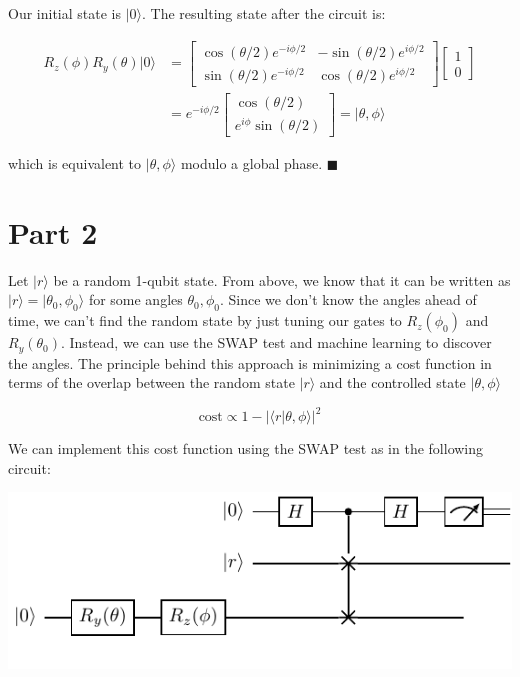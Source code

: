 \documentclass[11pt]{article}
\begin{document}
Our initial state is \(|0\rangle\). The resulting state after the circuit is:

\begin{align*}
R_z(\phi)R_y(\theta)|0\rangle &= 
\begin{bmatrix}
\cos(\theta/2)e^{-i\phi/2} & -\sin(\theta/2)e^{i\phi/2} \\
\sin(\theta/2)e^{-i\phi/2} & \cos(\theta/2)e^{i\phi/2}
\end{bmatrix}
\begin{bmatrix}
1 \\
0
\end{bmatrix} \\
&=
e^{-i\phi/2}\begin{bmatrix}
\cos(\theta/2) \\
e^{i\phi}\sin(\theta/2)
\end{bmatrix}
=
| \theta, \phi \rangle 
\end{align*}


which is equivalent to \(|\theta,\phi\rangle\) modulo a global phase. \(\blacksquare\)

\pagebreak

\section{Part 2}
\label{sec:org47932fd}

Let \(|r\rangle\) be a random 1-qubit state. From above, we know that it can be written as \(|r\rangle = |\theta_0,\phi_0\rangle\) for some angles \(\theta_0, \phi_0\). Since we don't know the angles ahead of time, we can't find the random state by just tuning our gates to \(R_z(\phi_0)\) and \(R_y(\theta_0)\). Instead, we can use the SWAP test and machine learning to discover the angles. The principle behind this approach is minimizing a cost function in terms of the overlap between the random state \(|r\rangle\) and the controlled state \(|\theta, \phi\rangle\)

\begin{equation*}
\text{cost} \propto 1-|\langle r | \theta, \phi \rangle|^2
\end{equation*}

We can implement this cost function using the SWAP test as in the following circuit:

\begin{center}
\includegraphics[width=.9\linewidth]{circuits/total/total.pdf}
\end{center}
\end{document}
